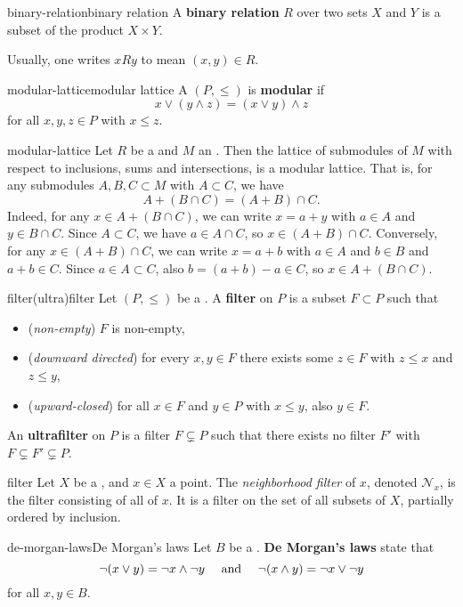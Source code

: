\begin{topic}{binary-relation}{binary relation}
    A \textbf{binary relation} $R$ over two sets $X$ and $Y$ is a subset of the product $X \times Y$.
    
    Usually, one writes $x R y$ to mean $(x, y) \in R$.
\end{topic}

\begin{topic}{modular-lattice}{modular lattice}
    A  $(P, \le)$ is \textbf{modular} if
    \[ x \lor (y \land z) = (x \lor y) \land z \]
    for all $x, y, z \in P$ with $x \le z$.
\end{topic}

\begin{example}{modular-lattice}
    Let $R$ be a  and $M$ an . Then the lattice of submodules of $M$ with respect to inclusions, sums and intersections, is a modular lattice. That is, for any submodules $A, B, C \subset M$ with $A \subset C$, we have
    \[ A + (B \cap C) = (A + B) \cap C . \]
    Indeed, for any $x \in A + (B \cap C)$, we can write $x = a + y$ with $a \in A$ and $y \in B \cap C$. Since $A \subset C$, we have $a \in A \cap C$, so $x \in (A + B) \cap C$. Conversely, for any $x \in (A + B) \cap C$, we can write $x = a + b$ with $a \in A$ and $b \in B$ and $a + b \in C$. Since $a \in A \subset C$, also $b = (a + b) - a \in C$, so $x \in A + (B \cap C)$.
\end{example}

\begin{topic}{filter}{(ultra)filter}
    Let $(P, \le)$ be a . A \textbf{filter} on $P$ is a subset $F \subset P$ such that
    \begin{itemize}
        \item (\textit{non-empty}) $F$ is non-empty,
        \item (\textit{downward directed}) for every $x, y \in F$ there exists some $z \in F$ with $z \le x$ and $z \le y$,
        \item (\textit{upward-closed}) for all $x \in F$ and $y \in P$ with $x \le y$, also $y \in F$.
    \end{itemize}
    An \textbf{ultrafilter} on $P$ is a filter $F \subsetneq P$ such that there exists no filter $F'$ with $F \subsetneq F' \subsetneq P$.
\end{topic}

\begin{example}{filter}
    Let $X$ be a , and $x \in X$ a point. The \textit{neighborhood filter} of $x$, denoted $\mathcal{N}_x$, is the filter consisting of all  of $x$. It is a filter on the set of all subsets of $X$, partially ordered by inclusion.
\end{example}

\begin{topic}{de-morgan-laws}{De Morgan's laws}
    Let $B$ be a . \textbf{De Morgan's laws} state that
    \[ \neg (x \lor y) = \neg x \land \neg y \quad \textup{ and } \quad \neg (x \land y) = \neg x \lor \neg y \]
    for all $x, y \in B$.
\end{topic}

